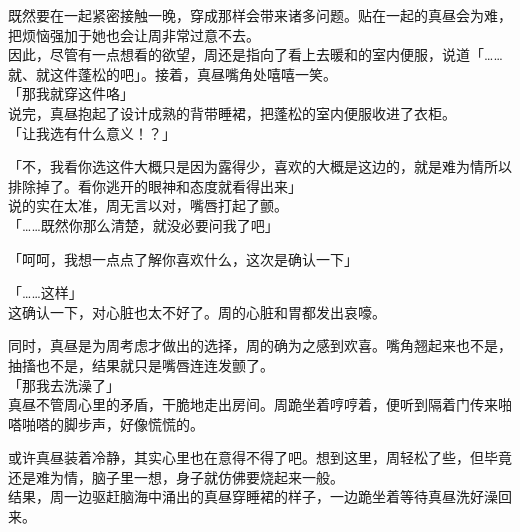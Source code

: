 既然要在一起紧密接触一晚，穿成那样会带来诸多问题。贴在一起的真昼会为难，把烦恼强加于她也会让周非常过意不去。\\

因此，尽管有一点想看的欲望，周还是指向了看上去暖和的室内便服，说道「……就、就这件蓬松的吧」。接着，真昼嘴角处嘻嘻一笑。\\

「那我就穿这件咯」\\

说完，真昼抱起了设计成熟的背带睡裙，把蓬松的室内便服收进了衣柜。\\

「让我选有什么意义！？」

「不，我看你选这件大概只是因为露得少，喜欢的大概是这边的，就是难为情所以排除掉了。看你逃开的眼神和态度就看得出来」\\

说的实在太准，周无言以对，嘴唇打起了颤。\\

「……既然你那么清楚，就没必要问我了吧」

「呵呵，我想一点点了解你喜欢什么，这次是确认一下」

「……这样」\\

这确认一下，对心脏也太不好了。周的心脏和胃都发出哀嚎。

同时，真昼是为周考虑才做出的选择，周的确为之感到欢喜。嘴角翘起来也不是，抽搐也不是，结果就只是嘴唇连连发颤了。\\

「那我去洗澡了」\\

真昼不管周心里的矛盾，干脆地走出房间。周跪坐着哼哼着，便听到隔着门传来啪嗒啪嗒的脚步声，好像慌慌的。

或许真昼装着冷静，其实心里也在意得不得了吧。想到这里，周轻松了些，但毕竟还是难为情，脑子里一想，身子就仿佛要烧起来一般。\\

结果，周一边驱赶脑海中涌出的真昼穿睡裙的样子，一边跪坐着等待真昼洗好澡回来。

